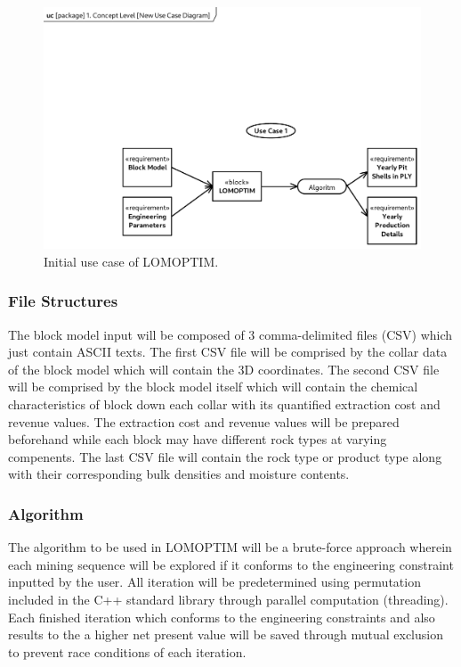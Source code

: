 \documentclass[12pt]{report}
\begin{document}
\begin{figure}[p]
    \centering
    \includegraphics[clip, trim=15mm 0 0 12mm, width=\linewidth]{img/usecase.pdf}
    \caption{Initial use case of LOMOPTIM.}
    \label{fig:usecase}
\end{figure}

\subsubsection{File Structures}

The block model input will be composed of 3 comma-delimited files (CSV) which just contain ASCII texts.
The first CSV file will be comprised by the collar data of the block model which will contain the 3D coordinates.
The second CSV file will be comprised by the block model itself which will contain the chemical characteristics of block down each collar with its quantified extraction cost and revenue values.
The extraction cost and revenue values will be prepared beforehand while each block may have different rock types at varying compenents.
The last CSV file will contain the rock type or product type along with their corresponding bulk densities and moisture contents.

\subsubsection{Algorithm}

The algorithm to be used in LOMOPTIM will be a brute-force approach wherein each mining sequence will be explored if it conforms to the engineering constraint inputted by the user.
All iteration will be predetermined using permutation included in the C++ standard library through parallel computation (threading).
Each finished iteration which conforms to the engineering constraints and also results to the a higher net present value will be saved through mutual exclusion to prevent race conditions of each iteration.
\end{document}
